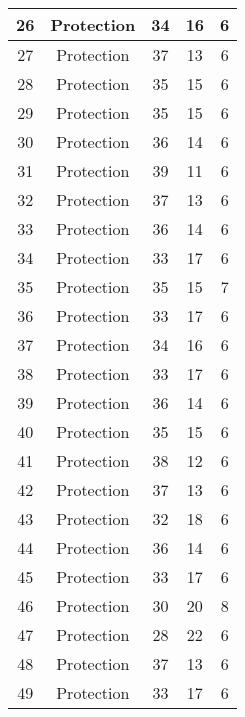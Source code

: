 \documentclass[results.tex]{subfiles}
\begin{document}
\begin{center}
\begin{tabular}{| c || c | c | c | c |}
    \hline
    26 & Protection & 34 & 16 & 6 \\ 
    \hline
    27 & Protection & 37 & 13 & 6 \\ 
    \hline
    28 & Protection & 35 & 15 & 6 \\ 
    \hline
    29 & Protection & 35 & 15 & 6 \\ 
    \hline
    30 & Protection & 36 & 14 & 6 \\ 
    \hline
    31 & Protection & 39 & 11 & 6 \\ 
    \hline
    32 & Protection & 37 & 13 & 6 \\ 
    \hline
    33 & Protection & 36 & 14 & 6 \\ 
    \hline
    34 & Protection & 33 & 17 & 6 \\ 
    \hline
    35 & Protection & 35 & 15 & 7 \\ 
    \hline
    36 & Protection & 33 & 17 & 6 \\ 
    \hline
    37 & Protection & 34 & 16 & 6 \\ 
    \hline
    38 & Protection & 33 & 17 & 6 \\ 
    \hline
    39 & Protection & 36 & 14 & 6 \\ 
    \hline
    40 & Protection & 35 & 15 & 6 \\ 
    \hline
    41 & Protection & 38 & 12 & 6 \\ 
    \hline
    42 & Protection & 37 & 13 & 6 \\ 
    \hline
    43 & Protection & 32 & 18 & 6 \\ 
    \hline
    44 & Protection & 36 & 14 & 6 \\ 
    \hline
    45 & Protection & 33 & 17 & 6 \\ 
    \hline
    46 & Protection & 30 & 20 & 8 \\ 
    \hline
    47 & Protection & 28 & 22 & 6 \\ 
    \hline
    48 & Protection & 37 & 13 & 6 \\ 
    \hline
    49 & Protection & 33 & 17 & 6 \\ 
    \hline   \end{tabular}
\end{center}
\end{document}
